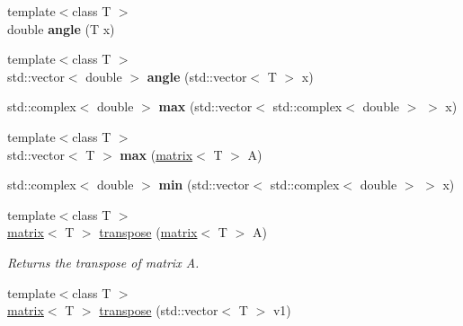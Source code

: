 \begin{DoxyCompactItemize}
\item 
\hypertarget{namespacekeycpp_a83c90b0df3a170c845b848593be4cb74}{{\footnotesize template$<$class T $>$ }\\double {\bfseries angle} (T x)}\label{namespacekeycpp_a83c90b0df3a170c845b848593be4cb74}

\item 
\hypertarget{namespacekeycpp_a13ee1c3dd9cbb21a325260188a7fa860}{{\footnotesize template$<$class T $>$ }\\std\-::vector$<$ double $>$ {\bfseries angle} (std\-::vector$<$ T $>$ x)}\label{namespacekeycpp_a13ee1c3dd9cbb21a325260188a7fa860}

\item 
\hypertarget{namespacekeycpp_a73269c9db9fe25412819858bd7048ae5}{std\-::complex$<$ double $>$ {\bfseries max} (std\-::vector$<$ std\-::complex$<$ double $>$ $>$ x)}\label{namespacekeycpp_a73269c9db9fe25412819858bd7048ae5}

\item 
\hypertarget{namespacekeycpp_aed77b31791ec78800e98ace1cbc3693d}{{\footnotesize template$<$class T $>$ }\\std\-::vector$<$ T $>$ {\bfseries max} (\hyperlink{classkeycpp_1_1matrix}{matrix}$<$ T $>$ A)}\label{namespacekeycpp_aed77b31791ec78800e98ace1cbc3693d}

\item 
\hypertarget{namespacekeycpp_ab7577228b38fa6a1911ac65fb80832f3}{std\-::complex$<$ double $>$ {\bfseries min} (std\-::vector$<$ std\-::complex$<$ double $>$ $>$ x)}\label{namespacekeycpp_ab7577228b38fa6a1911ac65fb80832f3}

\item 
\hypertarget{namespacekeycpp_ad68697505d1a1a85f30a18b0e9b0eb2f}{{\footnotesize template$<$class T $>$ }\\\hyperlink{classkeycpp_1_1matrix}{matrix}$<$ T $>$ \hyperlink{namespacekeycpp_ad68697505d1a1a85f30a18b0e9b0eb2f}{transpose} (\hyperlink{classkeycpp_1_1matrix}{matrix}$<$ T $>$ A)}\label{namespacekeycpp_ad68697505d1a1a85f30a18b0e9b0eb2f}

\begin{DoxyCompactList}\small\item\em Returns the transpose of matrix A. \end{DoxyCompactList}\item 
\hypertarget{namespacekeycpp_aa148d677899a0da5ab14edfc5057a97b}{{\footnotesize template$<$class T $>$ }\\\hyperlink{classkeycpp_1_1matrix}{matrix}$<$ T $>$ \hyperlink{namespacekeycpp_aa148d677899a0da5ab14edfc5057a97b}{transpose} (std\-::vector$<$ T $>$ v1)}\label{namespacekeycpp_aa148d677899a0da5ab14edfc5057a97b}


\end{DoxyCompactItemize}
